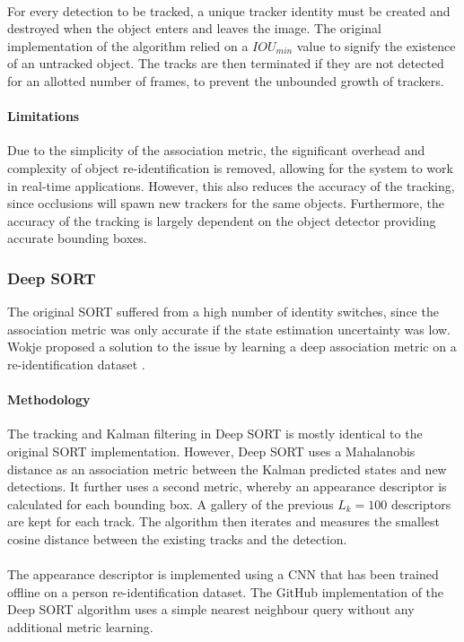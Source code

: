 \paragraph{} For every detection to be tracked, a unique tracker identity must be created and destroyed when the object enters and leaves the image. The original implementation of the algorithm relied on a $IOU_{min}$ value to signify the existence of an untracked object. The tracks are then terminated if they are not detected for an allotted number of frames, to prevent the unbounded growth of trackers.

\paragraph{Limitations}
Due to the simplicity of the association metric, the significant overhead and complexity of object re-identification is removed, allowing for the system to work in real-time applications. However, this also reduces the accuracy of the tracking, since occlusions will spawn new trackers for the same objects. Furthermore, the accuracy of the tracking is largely dependent on the object detector providing accurate bounding boxes.

\subsubsection{Deep SORT}
The original SORT suffered from a high number of identity switches, since the association metric was only accurate if the state estimation uncertainty was low. Wokje proposed a solution to the issue by learning a deep association metric on a re-identification dataset \cite{Wojke2018}. 

\paragraph{Methodology} The tracking and Kalman filtering in Deep SORT is mostly identical to the original SORT implementation. However, Deep SORT uses a Mahalanobis distance as an association metric between the Kalman predicted states and new detections. It further uses a second metric, whereby an appearance descriptor is calculated for each bounding box. A gallery of the previous $L_{k} = 100$ descriptors are kept for each track. The algorithm then iterates and measures the smallest cosine distance between the existing tracks and the detection.

\paragraph{} The appearance descriptor is implemented using a CNN that has been trained offline on a person re-identification dataset. The GitHub implementation of the Deep SORT algorithm uses a simple nearest neighbour query without any additional metric learning.

